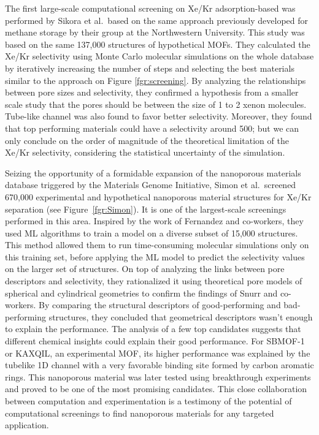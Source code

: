 \documentclass[main.tex]{subfiles}
\begin{document}
The first large-scale computational screening on Xe/Kr adsorption-based was performed by Sikora et al.\ based on the same approach previously developed for methane storage by their group at the Northwestern University.\cite{Sikora_2012} This study was based on the same {137,000} structures of hypothetical MOFs.\cite{Wilmer_2012} They calculated the Xe/Kr selectivity using Monte Carlo molecular simulations on the whole database by iteratively increasing the number of steps and selecting the best materials similar to the approach on Figure \ref{fgr:screening}. By analyzing the relationships between pore sizes and selectivity, they confirmed a hypothesis from a smaller scale study that the pores should be between the size of 1 to 2 xenon molecules.\cite{Ryan_2010} Tube-like channel was also found to favor better selectivity. Moreover, they found that top performing materials could have a selectivity around 500; but we can only conclude on the order of magnitude of the theoretical limitation of the Xe/Kr selectivity, considering the statistical uncertainty of the simulation.

Seizing the opportunity of a formidable expansion of the nanoporous materials database triggered by the Materials Genome Initiative, Simon et al.\ screened 670,000 experimental and hypothetical nanoporous material structures for Xe/Kr separation (see Figure~\ref{fgr:Simon}).\cite{Simon_2015} It is one of the largest-scale screenings performed in this area. Inspired by the work of Fernandez and co-workers,\cite{Fernandez_2013} they used ML algorithms to train a model on a diverse subset of 15,000 structures. This method allowed them to run time-consuming molecular simulations only on this training set, before applying the ML model to predict the selectivity values on the larger set of structures. On top of analyzing the links between pore descriptors and selectivity, they rationalized it using theoretical pore models of spherical and cylindrical geometries to confirm the findings of Snurr and co-workers.\cite{Ryan_2010,Sikora_2012} By comparing the structural descriptors of good-performing and bad-performing structures, they concluded that geometrical descriptors wasn't enough to explain the performance. The analysis of a few top candidates suggests that different chemical insights could explain their good performance. For SBMOF-1 or KAXQIL,\cite{KAXQIL} an experimental MOF, its higher performance was explained by the tubelike 1D channel with a very favorable binding site formed by carbon aromatic rings. This nanoporous material was later tested using breakthrough experiments and proved to be one of the most promising candidates.\cite{Banerjee_2016} This close collaboration between computation and experimentation is a testimony of the potential of computational screenings to find nanoporous materials for any targeted application.
\end{document}
